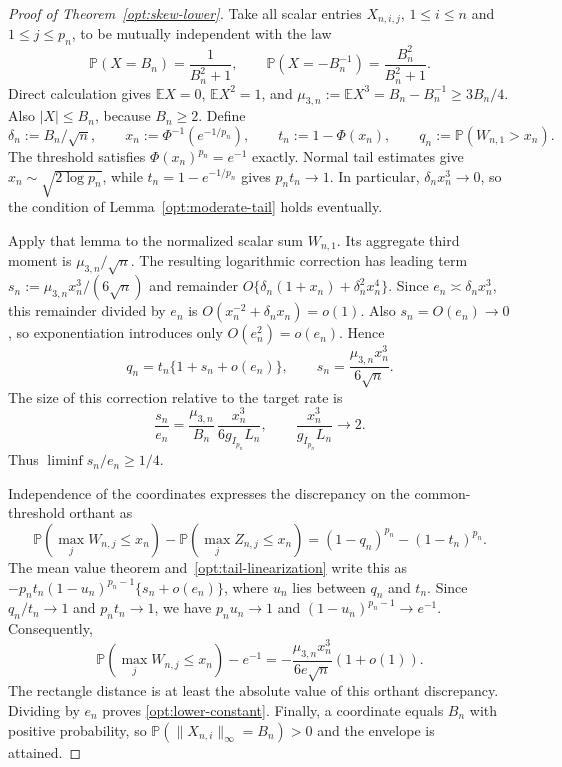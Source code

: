 \documentclass[11pt,letterpaper]{article}
\theoremstyle{remark}
\newcommand{\E}{\mathbb E}
\newcommand{\Pp}{\mathbb P}
\begin{document}
\begin{proof}[Proof of Theorem~\ref{opt:skew-lower}]
Take all scalar entries $X_{n,i,j}$, $1\le i\le n$ and
$1\le j\le p_n$, to be mutually independent with the law
\begin{equation}
 \Pp(X=B_n)=\frac1{B_n^2+1},\qquad
 \Pp(X=-B_n^{-1})=\frac{B_n^2}{B_n^2+1}.
 \label{opt:two-point-law}
\end{equation}
Direct calculation gives $\E X=0$, $\E X^2=1$, and
$\mu_{3,n}:=\E X^3=B_n-B_n^{-1}\ge3B_n/4$.
Also $|X|\le B_n$, because $B_n\ge2$. Define
\[
 \delta_n:=B_n/\sqrt n,\qquad
 x_n:=\Phi^{-1}(e^{-1/p_n}),\qquad
 t_n:=1-\Phi(x_n),\qquad q_n:=\Pp(W_{n,1}>x_n).
\]
The threshold satisfies $\Phi(x_n)^{p_n}=e^{-1}$ exactly.
Normal tail estimates give $x_n\sim\sqrt{2\log p_n}$,
while $t_n=1-e^{-1/p_n}$ gives $p_nt_n\to1$.
In particular, $\delta_nx_n^3\to0$, so the condition of
Lemma~\ref{opt:moderate-tail} holds eventually.

Apply that lemma to the normalized scalar sum $W_{n,1}$.
Its aggregate third moment is $\mu_{3,n}/\sqrt n$.
The resulting logarithmic correction has leading term
$s_n:=\mu_{3,n}x_n^3/(6\sqrt n)$ and remainder
$O\{\delta_n(1+x_n)+\delta_n^2x_n^4\}$.
Since $e_n\asymp\delta_nx_n^3$, this remainder divided by
$e_n$ is $O(x_n^{-2}+\delta_nx_n)=o(1)$.
Also $s_n=O(e_n)\to0$, so exponentiation introduces only
$O(e_n^2)=o(e_n)$. Hence
\begin{equation}
 q_n=t_n\{1+s_n+o(e_n)\},\qquad
 s_n=\frac{\mu_{3,n}x_n^3}{6\sqrt n}.
 \label{opt:tail-linearization}
\end{equation}
The size of this correction relative to the target rate is
\[
 \frac{s_n}{e_n}
 =\frac{\mu_{3,n}}{B_n}\,
   \frac{x_n^3}{6g_{I_{p_n}}L_n},\qquad
 \frac{x_n^3}{g_{I_{p_n}}L_n}\longrightarrow2.
\]
Thus $\liminf s_n/e_n\ge1/4$.

Independence of the coordinates expresses the discrepancy on the
common-threshold orthant as
\[
 \Pp(\max_jW_{n,j}\le x_n)-\Pp(\max_jZ_{n,j}\le x_n)
 =(1-q_n)^{p_n}-(1-t_n)^{p_n}.
\]
The mean value theorem and~\eqref{opt:tail-linearization} write
this as
$-p_nt_n(1-u_n)^{p_n-1}\{s_n+o(e_n)\}$, where $u_n$
lies between $q_n$ and $t_n$. Since $q_n/t_n\to1$ and
$p_nt_n\to1$, we have $p_nu_n\to1$ and
$(1-u_n)^{p_n-1}\to e^{-1}$. Consequently,
\begin{equation}
 \Pp(\max_jW_{n,j}\le x_n)-e^{-1}
 =-\frac{\mu_{3,n}x_n^3}{6e\sqrt n}(1+o(1)).
 \label{opt:exact-product-asymptotic}
\end{equation}
The rectangle distance is at least the absolute value of this
orthant discrepancy. Dividing by $e_n$ proves
\eqref{opt:lower-constant}. Finally, a coordinate equals $B_n$
with positive probability, so
$\Pp(\|X_{n,i}\|_\infty=B_n)>0$ and the envelope is attained.
\end{proof}
\end{document}

